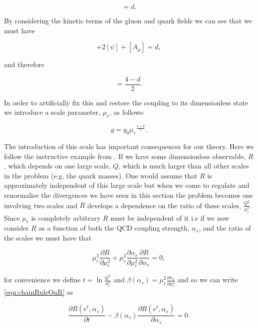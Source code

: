 		\begin{equation}
			[\mathcal{L}] = d.
		\end{equation}

		By considering the kinetic terms of the gluon and quark fields we can see that we must have

		\begin{equation}
			[g] + 2[\psi] + [A_\mu] = d,
		\end{equation}

		and therefore

		\begin{equation}
			[g] = \frac{4-d}{2}.
		\end{equation}

		In order to artificially fix this and restore the coupling to its dimensionless state we
		introduce a scale parameter, $\mu_r$, as follows:

		\begin{equation}
			g = g_0{\mu_r}^{\frac{4-d}{2}}.
		\end{equation}

		The introduction of this scale has important consequences for our theory.  Here we follow the instructive example
		from \cite{pinkBook}.  If we have some dimensionless observable, $R$, which depends on one large scale, $Q$, which
		is much larger than all other scales in the problem (e.g. the quark masses).  One would assume that $R$ is
		approximately independent of this large scale but when we come to regulate and renormalise the divergences we have
		seen in this section the problem becomes one involving two scales and $R$ develops a dependence on the ratio of
		these scales, $\frac{Q^2}{\mu_r^2}$.  Since $\mu_r$ is completely arbitrary $R$ must be independent of it i.e if we
		now consider $R$ as a function of both the QCD coupling strength, $\alpha_s$, and the ratio of the scales we must
		have that

		\begin{equation}
			\mu_r^2\frac{\partial R}{\partial\mu_r^2} + \mu_r^2\frac{\partial \alpha_s}{\partial \mu_r^2}\frac{\partial R}{\partial\alpha_s} = 0,
			\label{eqn:chainRuleOnR}
		\end{equation}

		for convenience we define $t = \ln\frac{Q^2}{\mu_r^2}$ and $\beta(\alpha_s) = \mu_r^2\frac{\partial \alpha_s}{\partial \mu_r^2}$
		and so we can write \ref{eqn:chainRuleOnR} as

		\begin{equation}
			\frac{\partial R(e^t, \alpha_s)}{\partial t} - \beta(\alpha_s)\frac{\partial R(e^t, \alpha_s)}{\partial \alpha_s} = 0.
		\end{equation}

